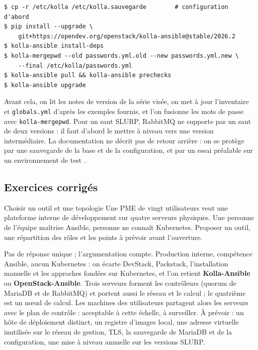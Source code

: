 \par\noindent\begin{minipage}{\linewidth}
\begin{lstlisting}[style=terminal]
$ cp -r /etc/kolla /etc/kolla.sauvegarde        # configuration d'abord
$ pip install --upgrade \
    git+https://opendev.org/openstack/kolla-ansible@stable/2026.2
$ kolla-ansible install-deps
$ kolla-mergepwd --old passwords.yml.old --new passwords.yml.new \
    --final /etc/kolla/passwords.yml
$ kolla-ansible pull && kolla-ansible prechecks
$ kolla-ansible upgrade
\end{lstlisting}
\end{minipage}\par

Avant cela, on lit les notes de version de la série visée, on met à jour l'inventaire et \texttt{globals.yml} d'après les exemples
fournis, et l'on fusionne les mots de passe avec \texttt{kolla-mergepwd}. Pour un saut SLURP, RabbitMQ ne supporte pas un saut de deux
versions : il faut d'abord le mettre à niveau vers une version intermédiaire. La documentation ne décrit pas de retour arrière :
on se protège par une sauvegarde de la base et de la configuration, et par un essai préalable sur un environnement de test
\parencite{kolla-ansible-operating}.

\subsection{Exercices corrigés}\label{sec:dep-exercices}

\begin{exercice}{Choisir un outil et une topologie}\label{ex:dep-choix}
Une PME de vingt utilisateurs veut une plateforme interne de développement sur quatre serveurs physiques. Une personne de l'équipe
maîtrise Ansible, personne ne connaît Kubernetes. Proposer un outil, une répartition des rôles et les points à prévoir avant
l'ouverture.
\end{exercice}
\begin{correction}
Pas de réponse unique ; l'argumentation compte. Production interne, compétence Ansible, aucun Kubernetes : on écarte DevStack,
Packstack, l'installation manuelle et les approches fondées sur Kubernetes, et l'on retient \textbf{Kolla-Ansible} ou
\textbf{OpenStack-Ansible}. Trois serveurs forment les contrôleurs (quorum de MariaDB et de RabbitMQ) et portent aussi le réseau et
le calcul ; le quatrième est un nœud de calcul. Les machines des utilisateurs partagent alors les serveurs avec le plan de
contrôle : acceptable à cette échelle, à surveiller. À prévoir : un hôte de déploiement distinct, un registre d'images local, une
adresse virtuelle inutilisée sur le réseau de gestion, TLS, la sauvegarde de MariaDB et de la configuration, une mise à niveau
annuelle sur les versions SLURP.
\end{correction}

